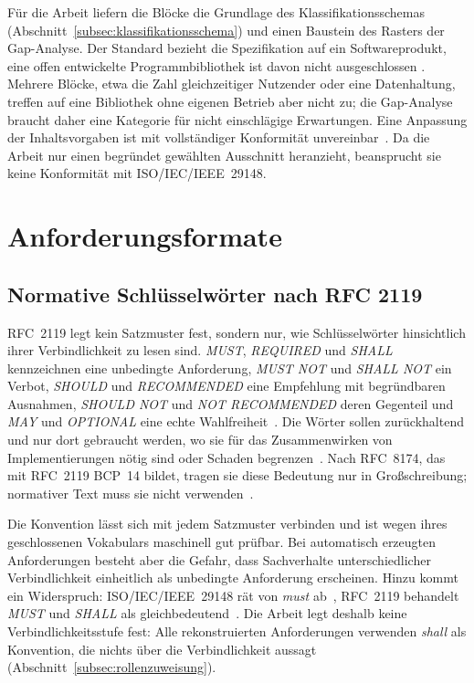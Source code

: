 \documentclass[11pt,a4paper]{report}
\begin{document}
Für die Arbeit liefern die Blöcke die Grundlage des
Klassifikationsschemas (Abschnitt~\ref{subsec:klassifikationsschema})
und einen Baustein des Rasters der Gap-Analyse. Der Standard bezieht
die Spezifikation auf ein Softwareprodukt, eine offen entwickelte
Programmbibliothek ist davon nicht ausgeschlossen
\cite[Abschn.~8.5.1]{iso29148}. Mehrere Blöcke, etwa die Zahl
gleichzeitiger Nutzender oder eine Datenhaltung, treffen auf eine
Bibliothek ohne eigenen Betrieb aber nicht zu; die Gap-Analyse
braucht daher eine Kategorie für nicht einschlägige Erwartungen. Eine
Anpassung der Inhaltsvorgaben ist mit vollständiger Konformität
unvereinbar~\cite[Anhang~C.1]{iso29148}. Da die Arbeit nur einen
begründet gewählten Ausschnitt heranzieht, beansprucht sie keine
Konformität mit ISO/IEC/IEEE~29148.

\section{Anforderungsformate}
\label{sec:anforderungsformate}

\subsection{Normative Schlüsselwörter nach RFC 2119}
\label{subsec:rfc2119}

RFC~2119 legt kein Satzmuster fest, sondern nur, wie Schlüsselwörter
hinsichtlich ihrer Verbindlichkeit zu lesen sind. \emph{MUST},
\emph{REQUIRED} und \emph{SHALL} kennzeichnen eine unbedingte
Anforderung, \emph{MUST NOT} und \emph{SHALL NOT} ein Verbot,
\emph{SHOULD} und \emph{RECOMMENDED} eine Empfehlung mit begründbaren
Ausnahmen, \emph{SHOULD NOT} und \emph{NOT RECOMMENDED} deren Gegenteil
und \emph{MAY} und \emph{OPTIONAL} eine echte
Wahlfreiheit~\cite[Abschn.~1--5]{rfc2119}. Die Wörter sollen
zurückhaltend und nur dort gebraucht werden, wo sie für das
Zusammenwirken von Implementierungen nötig sind oder Schaden
begrenzen~\cite[Abschn.~6]{rfc2119}. Nach RFC~8174, das mit RFC~2119
BCP~14 bildet, tragen sie diese Bedeutung nur in Großschreibung;
normativer Text muss sie nicht verwenden~\cite[Abschn.~2]{rfc8174}.

Die Konvention lässt sich mit jedem Satzmuster verbinden und ist wegen
ihres geschlossenen Vokabulars maschinell gut prüfbar. Bei
automatisch erzeugten Anforderungen besteht aber die Gefahr, dass
Sachverhalte unterschiedlicher Verbindlichkeit einheitlich als
unbedingte Anforderung erscheinen. Hinzu kommt ein Widerspruch:
ISO/IEC/IEEE~29148 rät von \emph{must} ab~\cite[Abschn.~5.2.4]{iso29148},
RFC~2119 behandelt \emph{MUST} und \emph{SHALL} als
gleichbedeutend~\cite[Abschn.~1]{rfc2119}. Die Arbeit legt deshalb
keine Verbindlichkeitsstufe fest: Alle rekonstruierten Anforderungen
verwenden \emph{shall} als Konvention, die nichts über die
Verbindlichkeit aussagt (Abschnitt~\ref{subsec:rollenzuweisung}).
\end{document}
